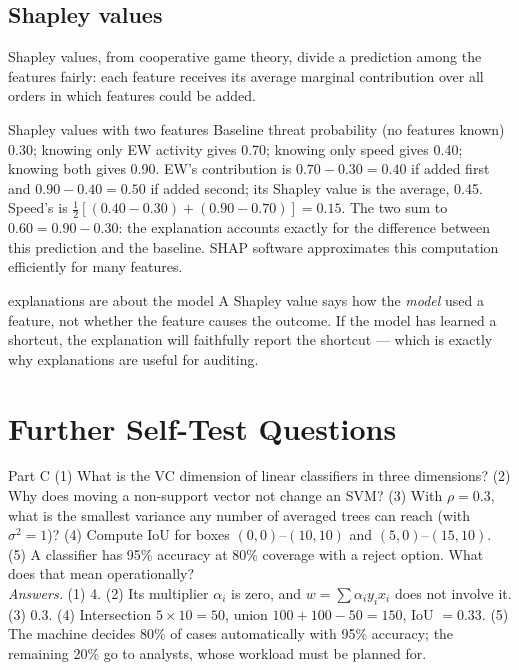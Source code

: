 \documentclass[11pt]{article}
\begin{document}
\subsection{Shapley values}
Shapley values, from cooperative game theory, divide a prediction among the features fairly: each feature receives its average marginal contribution over all orders in which features could be added.
\begin{example}{Shapley values with two features}
Baseline threat probability (no features known) 0.30; knowing only EW activity gives 0.70; knowing only speed gives 0.40; knowing both gives 0.90. EW's contribution is $0.70-0.30=0.40$ if added first and $0.90-0.40=0.50$ if added second; its Shapley value is the average, 0.45. Speed's is $\frac12[(0.40-0.30)+(0.90-0.70)]=0.15$. The two sum to $0.60=0.90-0.30$: the explanation accounts exactly for the difference between this prediction and the baseline. SHAP software approximates this computation efficiently for many features.
\end{example}
\begin{pitfall}{explanations are about the model}
A Shapley value says how the \emph{model} used a feature, not whether the feature causes the outcome. If the model has learned a shortcut, the explanation will faithfully report the shortcut --- which is exactly why explanations are useful for auditing.
\end{pitfall}

\section{Further Self-Test Questions}
\begin{question}{Part C}
(1) What is the VC dimension of linear classifiers in three dimensions? (2) Why does moving a non-support vector not change an SVM? (3) With $\rho=0.3$, what is the smallest variance any number of averaged trees can reach (with $\sigma^2=1$)? (4) Compute IoU for boxes $(0,0)$--$(10,10)$ and $(5,0)$--$(15,10)$. (5) A classifier has 95\% accuracy at 80\% coverage with a reject option. What does that mean operationally?\\
\textit{Answers.} (1) 4. (2) Its multiplier $\alpha_i$ is zero, and $w=\sum\alpha_iy_ix_i$ does not involve it. (3) 0.3. (4) Intersection $5\times10=50$, union $100+100-50=150$, IoU $=0.33$. (5) The machine decides 80\% of cases automatically with 95\% accuracy; the remaining 20\% go to analysts, whose workload must be planned for.
\end{question}
\end{document}
